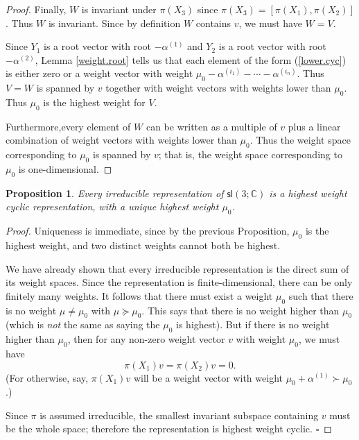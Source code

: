 \documentclass[12pt]{amsbook}
\theoremstyle{plain}
\newtheorem{proposition}[theorem]{Proposition}
\numberwithin{equation}{chapter}
\numberwithin{theorem}{chapter}
\begin{document}
\begin{proof}
Finally, $W$ is invariant under $\pi(X_{3})$ since $\pi(X_{3})=\left[
\pi(X_{1}),\pi(X_{2})\right]  $. Thus $W$ is invariant. Since by definition
$W$ contains $v$, we must have $W=V$.

Since $Y_{1}$ is a root vector with root $-\alpha^{(1)}$ and $Y_{2}$ is a root
vector with root $-\alpha^{(2)}$, Lemma \ref{weight.root} tells us that each
element of the form (\ref{lower.cyc}) is either zero or a weight vector with
weight $\mu_{0}-\alpha^{(i_{1})}-\cdots-\alpha^{(i_{n})}$. Thus $V=W$ is
spanned by $v$ together with weight vectors with weights lower than $\mu_{0}$.
Thus $\mu_{0}$ is the highest weight for $V$.

Furthermore,every element of $W$ can be written as a multiple of $v$ plus a
linear combination of weight vectors with weights lower than $\mu_{0}$. Thus
the weight space corresponding to $\mu_{0}$ is spanned by $v$; that is, the
weight space corresponding to $\mu_{0}$ is one-dimensional.
\end{proof}

\begin{proposition}
Every irreducible representation of $\mathsf{sl}\left(  3;\mathbb{C}\right)  $
is a highest weight cyclic representation, with a unique highest weight
$\mu_{0}$.
\end{proposition}

\begin{proof}
Uniqueness is immediate, since by the previous Proposition, $\mu_{0}$ is the
highest weight, and two distinct weights cannot both be highest.

We have already shown that every irreducible representation is the direct sum
of its weight spaces. Since the representation is finite-dimensional, there
can be only finitely many weights. It follows that there must exist a weight
$\mu_{0}$ such that there is no weight $\mu\neq\mu_{0}$ with $\mu\succeq
\mu_{0}$. This says that there is no weight higher than $\mu_{0}$ (which is
\textit{not} the same as saying the $\mu_{0}$ is highest). But if there is no
weight higher than $\mu_{0}$, then for any non-zero weight vector $v$ with
weight $\mu_{0}$, we must have
\[
\pi(X_{1})v=\pi(X_{2})v=0\text{.}%
\]
(For otherwise, say, $\pi(X_{1})v$ will be a weight vector with weight
$\mu_{0}+\alpha^{(1)}\succ\mu_{0}$.)

Since $\pi$ is assumed irreducible, the smallest invariant subspace containing
$v$ must be the whole space; therefore the representation is highest weight
cyclic. $\square$
\end{proof}
\end{document}
